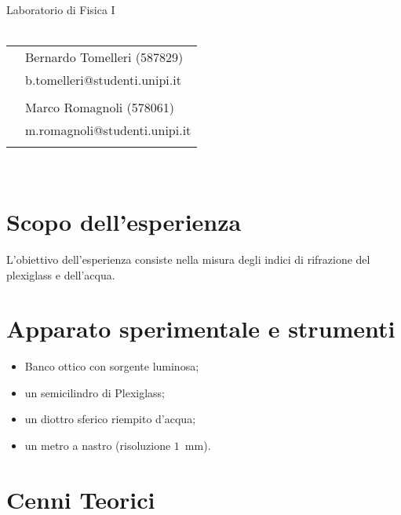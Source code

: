\documentclass{article}[a4paper,11pt]
\begin{document}
\begin{titlepage}
	\begin{center}
		{\huge{Laboratorio di Fisica I}}\\\vspace*{7mm} %
		{\huge{\textbf{\thetitle}}}\\\vspace*{15mm}
		\begin{tabular}{ll}
		& Bernardo Tomelleri (587829) \\
		& b.tomelleri@studenti.unipi.it\\ \\
		& Marco Romagnoli (578061) \\
		& m.romagnoli@studenti.unipi.it \\ \\
		\end{tabular}\\\vspace*{5mm}
		{\thedate}
	\end{center}
\end{titlepage}
\makeatother
\restoregeometry
\section{Scopo dell'esperienza}
L'obiettivo dell'esperienza consiste nella misura degli indici di rifrazione del plexiglass e dell'acqua.

\section{Apparato sperimentale e strumenti}
\begin{itemize}
\item Banco ottico con sorgente luminosa;
\item un semicilindro di Plexiglass;
\item un diottro sferico riempito d'acqua;
\item un metro a nastro (risoluzione $1$~mm).
\end{itemize}

\section{Cenni Teorici}
\end{document}
